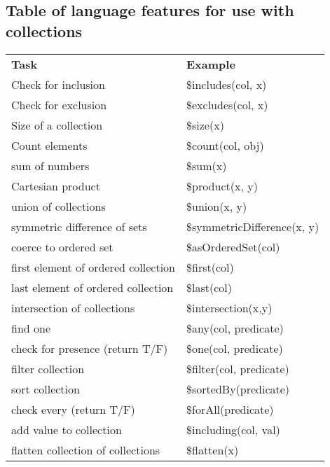 \documentclass[9pt,letterpaper]{article}
\begin{document}
\subsection{Table of language features for use with collections}
\begin{table}[H]
\begin{tabular}{l | l }
\textbf{Task}                       & \textbf{Example}               \\ \hhline{=|=}    
Check for inclusion                 & \$includes(col, x)             \\ 
Check for exclusion                 & \$excludes(col, x)             \\
Size of a collection                & \$size(x)                      \\
Count elements                      & \$count(col, obj)              \\
sum of  numbers                     & \$sum(x)                       \\
Cartesian product                   & \$product(x, y)                \\
union of collections                & \$union(x, y)                  \\
symmetric difference of sets        & \$symmetricDifference(x, y)    \\
coerce to ordered set               & \$asOrderedSet(col)            \\
first element of ordered collection & \$first(col)                   \\
last element of ordered collection  & \$last(col)                    \\
intersection of collections         & \$intersection(x,y)            \\
find one                            & \$any(col, predicate)          \\
check for presence (return T/F)     & \$one(col, predicate)          \\
filter collection                   & \$filter(col, predicate)       \\
sort collection                     & \$sortedBy(predicate)          \\
check every (return T/F)            & \$forAll(predicate)            \\
add value to collection             & \$including(col, val)          \\
flatten collection of collections   & \$flatten(x)         
\end{tabular}
\end{table}



\end{document}
